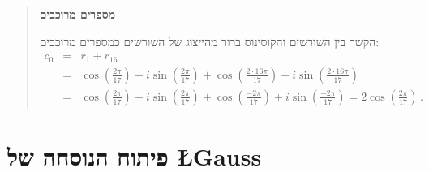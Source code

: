 \documentclass[11pt,a4paper]{article}
\newenvironment{form}[1]{%
\begin{displaymath}%
\renewcommand{\arraystretch}{#1}%
\begin{array}{lcl}}%
{\end{array}%
\end{displaymath}%
}
\newcommand*{\disfrac}[2]{\displaystyle\frac{#1}{#2}}
\begin{document}
\begin{quote}
\textbf{מספרים מרוכבים}

הקשר בין השורשים והקוסינוס ברור מהייצוג של השורשים כמספרים מרוכבים:
\begin{form}{1.8}
c_0\!\!\!&=&\!\!\!r_1+r_{16}\\
\!\!\!&=&\!\!\!\cos\left(\disfrac{2\pi}{17}\right)\!+i\sin\left(\disfrac{2\pi}{17}\right)+\cos\left(\disfrac{2\cdot 16\pi}{17}\right)\!+i\sin\left(\disfrac{2\cdot 16\pi}{17}\right)\\
\!\!\!&=&\!\!\!\cos\left(\disfrac{2\pi}{17}\right)\!+i\sin\left(\disfrac{2\pi}{17}\right)+\cos\left(\disfrac{-2\pi}{17}\right)\!+i\sin\left(\disfrac{-2\pi}{17}\right)=2\cos\left(\disfrac{2\pi}{17}\right)\,.
\end{form}
\end{quote}



\section{פיתוח הנוסחה של %
\L{Gauss}%
}\label{s.derivation}
\end{document}
